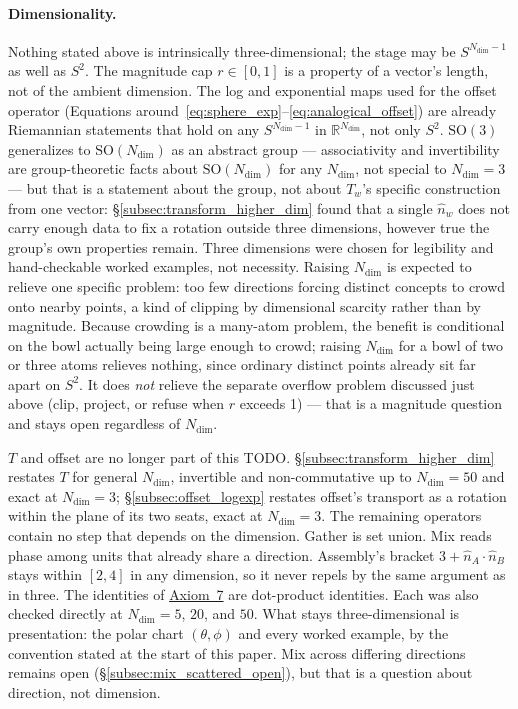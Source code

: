 \documentclass[12pt, a4paper]{article}
\begin{document}
\paragraph{Dimensionality.}
\label{subsec:dimensionality_open}
Nothing stated
above is intrinsically three-dimensional; the stage may be
$S^{N_{\mathrm{dim}}-1}$ as well as $S^2$. The magnitude cap
$r\in[0,1]$ is a property of a vector's length, not of the ambient
dimension. The log and exponential maps used for the offset operator
(Equations around~\eqref{eq:sphere_exp}--\eqref{eq:analogical_offset})
are already Riemannian statements that hold on any $S^{N_{\mathrm{dim}}-1}$ in
$\mathbb{R}^{N_{\mathrm{dim}}}$, not only $S^2$. $\mathrm{SO}(3)$ generalizes to
$\mathrm{SO}(N_{\mathrm{dim}})$ as an abstract group --- associativity and
invertibility are group-theoretic facts about $\mathrm{SO}(N_{\mathrm{dim}})$ for
any $N_{\mathrm{dim}}$, not special to $N_{\mathrm{dim}}=3$ --- but that is a statement about the
group, not about $T_w$'s specific construction from one vector:
\S\ref{subsec:transform_higher_dim} found that a single $\hat n_w$
does not carry enough data to fix a rotation outside three
dimensions, however true the group's own properties remain. Three
dimensions were chosen for legibility and hand-checkable worked
examples, not necessity. Raising $N_{\mathrm{dim}}$ is expected to relieve one
specific problem: too few directions forcing distinct concepts to
crowd onto nearby points, a kind of clipping by dimensional scarcity
rather than by magnitude. Because crowding is a many-atom problem, the
benefit is conditional on the bowl actually being large enough to
crowd; raising $N_{\mathrm{dim}}$ for a bowl of two or three atoms relieves nothing,
since ordinary distinct points already sit far apart on $S^2$. It does
\emph{not} relieve the separate
overflow problem discussed just above (clip, project, or refuse when
$r$ exceeds 1) --- that is a magnitude question and stays open
regardless of $N_{\mathrm{dim}}$.

$T$ and offset are no longer part of this TODO.
\S\ref{subsec:transform_higher_dim} restates $T$ for general
$N_{\mathrm{dim}}$, invertible and non-commutative up to
$N_{\mathrm{dim}}=50$ and exact at $N_{\mathrm{dim}}=3$;
\S\ref{subsec:offset_logexp} restates offset's transport as a
rotation within the plane of its two seats, exact at
$N_{\mathrm{dim}}=3$. The remaining operators contain no step that
depends on the dimension. Gather is set union. Mix reads phase among
units that already share a direction. Assembly's bracket
$3+\hat n_A\cdot\hat n_B$ stays within $[2,4]$ in any dimension, so it
never repels by the same argument as in three. The identities of
\hyperref[subsec:axiom_v1_metrics]{Axiom~7} are dot-product
identities. Each was also checked directly at $N_{\mathrm{dim}}=5$,
$20$, and $50$. What stays three-dimensional is presentation: the
polar chart $(\theta,\phi)$ and every worked example, by the
convention stated at the start of this paper. Mix across differing
directions remains open (\S\ref{subsec:mix_scattered_open}), but
that is a question about direction, not dimension.
\end{document}
